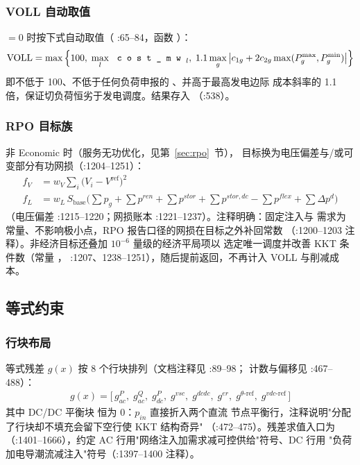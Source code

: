 \subsubsection*{VOLL 自动取值}
$=0$ 时按下式自动取值（
:65--84，函数
）：
\begin{align*}
\mathrm{VOLL}=\max\Big\{100,\;\max_{l}\,\fld{cost\_mw}_l,\;
1.1\max_{g}\big|c_{1g}+2c_{2g}\max(P^{\max}_g,P^{\min}_g)\big|\Big\}
\end{align*}
即不低于 100、不低于任何负荷申报的 、并高于最高发电边际
成本斜率的 1.1 倍，保证切负荷恒劣于发电调度。结果存入
（:538）。

\subsubsection*{RPO 目标族}
 非 Economic 时（服务无功优化，见第~\ref{sec:rpo}~节），
目标换为电压偏差与/或可变部分有功网损（:1204--1251）：
\begin{align*}
f_{V}&=w_V\sum_{i}\big(V_i-V^{\mathrm{ref}}\big)^2\\
f_{L}&=w_L\,S_{\mathrm{base}}\Big(\sum p_g+\sum p^{ren}+\sum p^{stor}
+\sum p^{stor,dc}-\sum p^{flex}+\sum \Delta p^d\Big)
\end{align*}
（电压偏差 :1215--1220；网损账本 :1221--1237）。注释明确：固定注入与
需求为常量、不影响极小点，RPO 报告口径的网损在目标之外补回常数
（:1200--1203 注释）。非经济目标还叠加 $10^{-6}$ 量级的经济平局项以
选定唯一调度并改善 KKT 条件数（常量 ，
:1207、1238--1251），随后提前返回，不再计入 VOLL 与削减成本。

\subsection{等式约束}

\subsubsection*{行块布局}
等式残差 $g(x)$ 按 8 个行块排列（文档注释见
\allowbreak :89--98；
计数与偏移见 \allowbreak :467--488）：
\begin{align*}
g(x)=\big[\,g^P_{ac},\; g^Q_{ac},\; g^P_{dc},\; g^{vsc},\;
g^{dcdc},\; g^{er},\; g^{\theta\text{-ref}},\; g^{vdc\text{-ref}}\,\big]
\end{align*}
其中 DC/DC 平衡块  恒为 0：$p_{in}$ 直接折入两个直流
节点平衡行，注释说明"分配了行块却不填充会留下空行使 KKT 结构奇异"
（:472--475）。残差求值入口为 
（:1401--1666），约定 AC 行用"网络注入加需求减可控供给"符号、DC 行用
"负荷加电导潮流减注入"符号（:1397--1400 注释）。

